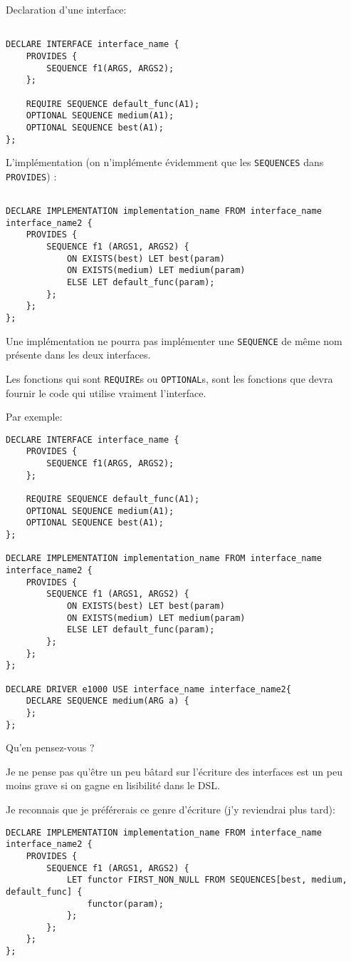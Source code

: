 \documentclass[french]{rtxreport}
\begin{document}
Declaration d'une interface:

\begin{lstlisting}

DECLARE INTERFACE interface_name {
	PROVIDES {
		SEQUENCE f1(ARGS, ARGS2);
	};

	REQUIRE SEQUENCE default_func(A1);
	OPTIONAL SEQUENCE medium(A1);
	OPTIONAL SEQUENCE best(A1);
};

\end{lstlisting}

L’implémentation (on n’implémente évidemment que les \texttt{SEQUENCES} dans \texttt{PROVIDES}) :
\begin{lstlisting}

DECLARE IMPLEMENTATION implementation_name FROM interface_name interface_name2 {
	PROVIDES {
		SEQUENCE f1 (ARGS1, ARGS2) {
			ON EXISTS(best) LET best(param)
			ON EXISTS(medium) LET medium(param)
			ELSE LET default_func(param);
		};
	};
};
\end{lstlisting}
Une implémentation ne pourra pas implémenter une \texttt{SEQUENCE} de même nom présente dans les deux interfaces.

Les fonctions qui sont \texttt{REQUIRE}s ou \texttt{OPTIONAL}s, sont les fonctions que devra fournir le code qui utilise vraiment l’interface.

Par exemple:

\begin{lstlisting}
DECLARE INTERFACE interface_name {
	PROVIDES {
		SEQUENCE f1(ARGS, ARGS2);
	};

	REQUIRE SEQUENCE default_func(A1);
	OPTIONAL SEQUENCE medium(A1);
	OPTIONAL SEQUENCE best(A1);
};

DECLARE IMPLEMENTATION implementation_name FROM interface_name interface_name2 {
	PROVIDES {
		SEQUENCE f1 (ARGS1, ARGS2) {
			ON EXISTS(best) LET best(param)
			ON EXISTS(medium) LET medium(param)
			ELSE LET default_func(param);
		};
	};
};

DECLARE DRIVER e1000 USE interface_name interface_name2{
	DECLARE SEQUENCE medium(ARG a) {
	};
};
\end{lstlisting}
Qu’en pensez-vous ?

Je ne pense pas qu’être un peu bâtard sur l’écriture des interfaces est un peu moins grave si on gagne en lisibilité dans le DSL.

Je reconnais que je préférerais ce genre d’écriture (j'y reviendrai plus tard):

\begin{lstlisting}
DECLARE IMPLEMENTATION implementation_name FROM interface_name interface_name2 {
	PROVIDES {
		SEQUENCE f1 (ARGS1, ARGS2) {
			LET functor FIRST_NON_NULL FROM SEQUENCES[best, medium, default_func] {
				functor(param);
			};
		};
	};
};
\end{lstlisting}
\end{document}
